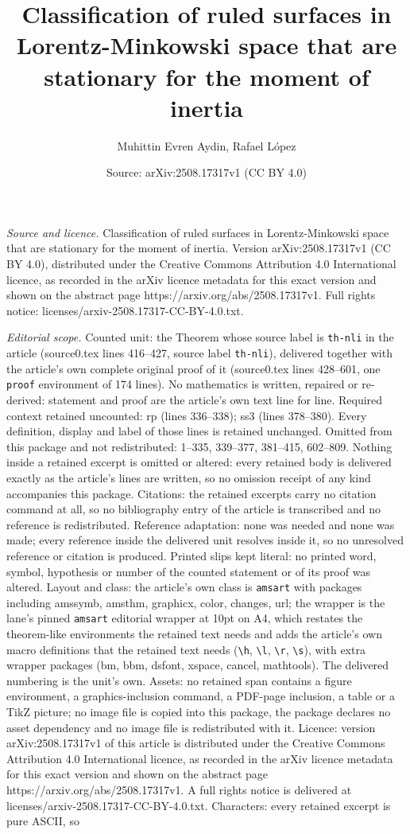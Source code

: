 \documentclass[10pt,a4paper]{amsart}
\title[Classification of ruled surfaces in Lorentz-Minkowski space ]{Classification of ruled surfaces in Lorentz-Minkowski space that are stationary for the moment of inertia}
\author{Muhittin Evren Aydin, Rafael L\'opez}
\date{Source: arXiv:2508.17317v1 (CC BY 4.0)}
\begin{document}
\maketitle

\noindent\emph{Source and licence.} Classification of ruled surfaces in Lorentz-Minkowski space that are stationary for the moment of inertia. Version arXiv:2508.17317v1 (CC BY 4.0), distributed under the Creative Commons Attribution 4.0 International licence, as recorded in the arXiv licence metadata for this exact version and shown on the abstract page https://arxiv.org/abs/2508.17317v1. Full rights notice: licenses/arxiv-2508.17317-CC-BY-4.0.txt.\par\smallskip

\noindent\textit{Editorial scope.} Counted unit: the Theorem whose source label is \texttt{th-nli} in the article (source0.tex lines 416--427, source label \texttt{th-nli}), delivered together with the article's own complete original proof of it (source0.tex lines 428--601, one \texttt{proof} environment of 174 lines). No mathematics is written, repaired or re-derived: statement and proof are the article's own text line for line. Required context retained uncounted: rp (lines 336--338); ss3 (lines 378--380). Every definition, display and label of those lines is retained unchanged. Omitted from this package and not redistributed: 1--335, 339--377, 381--415, 602--809. Nothing inside a retained excerpt is omitted or altered: every retained body is delivered exactly as the article's lines are written, so no omission receipt of any kind accompanies this package. Citations: the retained excerpts carry no citation command at all, so no bibliography entry of the article is transcribed and no reference is redistributed. Reference adaptation: none was needed and none was made; every reference inside the delivered unit resolves inside it, so no unresolved reference or citation is produced. Printed slips kept literal: no printed word, symbol, hypothesis or number of the counted statement or of its proof was altered. Layout and class: the article's own class is \texttt{amsart} with packages including amssymb, amsthm, graphicx, color, changes, url; the wrapper is the lane's pinned \texttt{amsart} editorial wrapper at 10pt on A4, which restates the theorem-like environments the retained text needs and adds the article's own macro definitions that the retained text needs (\texttt{\textbackslash h}, \texttt{\textbackslash l}, \texttt{\textbackslash r}, \texttt{\textbackslash s}), with extra wrapper packages (bm, bbm, dsfont, xspace, cancel, mathtools). The delivered numbering is the unit's own. Assets: no retained span contains a figure environment, a graphics-inclusion command, a PDF-page inclusion, a table or a TikZ picture; no image file is copied into this package, the package declares no asset dependency and no image file is redistributed with it. Licence: version arXiv:2508.17317v1 of this article is distributed under the Creative Commons Attribution 4.0 International licence, as recorded in the arXiv licence metadata for this exact version and shown on the abstract page https://arxiv.org/abs/2508.17317v1. A full rights notice is delivered at licenses/arxiv-2508.17317-CC-BY-4.0.txt. Characters: every retained excerpt is pure ASCII, so 
\end{document}
